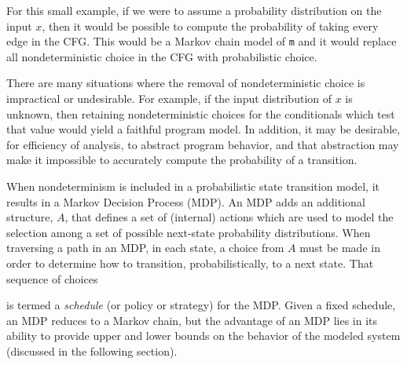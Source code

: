 For this small example, if we were to assume a probability
distribution on the input $x$, then it would be possible
to compute the probability of taking every edge in the CFG.   
This would be a Markov chain model of {\tt m} and it would replace
all nondeterministic choice in the CFG with probabilistic choice.

There are many situations where the removal of nondeterministic
choice is impractical or undesirable.  For example, if the input
distribution of $x$ is unknown, then retaining nondeterministic
choices for the conditionals which test that value would yield a
faithful program model.  In addition, it may be desirable, for
efficiency of analysis, to abstract program behavior, and that
abstraction may make it impossible to accurately compute the 
probability of a transition.  

When nondeterminism is included in a probabilistic state
transition model, it results in a Markov Decision Process (MDP).  
An MDP adds an additional structure, $A$, that defines
a set of (internal) actions which are used to model the
selection among a set of possible next-state probability distributions.
When traversing a path in an MDP, in each state, a choice
from $A$ must be made in order to determine how to transition,
probabilistically, to a next state.   That sequence of choices
 is termed a \textit{schedule} (or policy or 
strategy) for the MDP.
Given a fixed schedule, an MDP reduces to a Markov chain, but
the advantage of an MDP lies in its ability to provide upper and
lower bounds on the behavior of the modeled system (discussed
in the following section).
